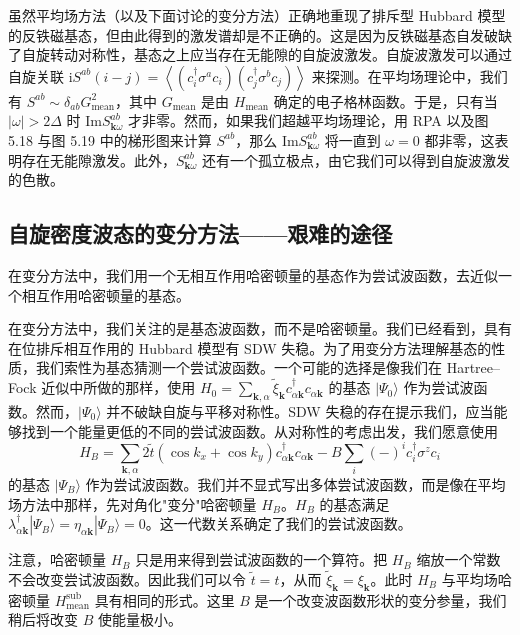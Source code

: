 虽然平均场方法（以及下面讨论的变分方法）正确地重现了排斥型 Hubbard 模型的反铁磁基态，但由此得到的激发谱却是不正确的。这是因为反铁磁基态自发破缺了自旋转动对称性，基态之上应当存在无能隙的自旋波激发。自旋波激发可以通过自旋关联 $\mathrm{i}S^{ab}(i-j)=\left\langle (c^{\dagger}_{i}\sigma^{a}c_{i})(c^{\dagger}_{j}\sigma^{b}c_{j})\right\rangle$ 来探测。在平均场理论中，我们有 $S^{ab}\sim\delta_{ab}G^{2}_{\mathrm{mean}}$，其中 $G_{\mathrm{mean}}$ 是由 $H_{\mathrm{mean}}$ 确定的电子格林函数。于是，只有当 $|\omega|>2\Delta$ 时 $\mathrm{Im}S^{ab}_{\pmb{k}\omega}$ 才非零。然而，如果我们超越平均场理论，用 RPA 以及图 5.18 与图 5.19 中的梯形图来计算 $S^{ab}$，那么 $\mathrm{Im}S^{ab}_{\pmb{k}\omega}$ 将一直到 $\omega=0$ 都非零，这表明存在无能隙激发。此外，$S^{ab}_{\pmb{k}\omega}$ 还有一个孤立极点，由它我们可以得到自旋波激发的色散。

\subsection{自旋密度波态的变分方法——艰难的途径}

\begin{keypoints}
\item 在变分方法中，我们用一个无相互作用哈密顿量的基态作为尝试波函数，去近似一个相互作用哈密顿量的基态。
\end{keypoints}

在变分方法中，我们关注的是基态波函数，而不是哈密顿量。我们已经看到，具有在位排斥相互作用的 Hubbard 模型有 SDW 失稳。为了用变分方法理解基态的性质，我们索性为基态猜测一个尝试波函数。一个可能的选择是像我们在 Hartree–Fock 近似中所做的那样，使用 $H_{0}=\sum_{\pmb{k},\alpha}\tilde{\xi}_{\pmb{k}}c^{\dagger}_{\alpha\pmb{k}}c_{\alpha\pmb{k}}$ 的基态 $|\Psi_{0}\rangle$ 作为尝试波函数。然而，$|\Psi_{0}\rangle$ 并不破缺自旋与平移对称性。SDW 失稳的存在提示我们，应当能够找到一个能量更低的不同的尝试波函数。从对称性的考虑出发，我们愿意使用
\begin{equation*}
H_{B}=\sum_{\pmb{k},\alpha}2\tilde{t}(\cos k_{x}+\cos k_{y})c^{\dagger}_{\alpha\pmb{k}}c_{\alpha\pmb{k}}-B\sum_{i}(-)^{i}c^{\dagger}_{i}\sigma^{z}c_{i}
\end{equation*}
的基态 $|\Psi_{B}\rangle$ 作为尝试波函数。我们并不显式写出多体尝试波函数，而是像在平均场方法中那样，先对角化"变分"哈密顿量 $H_{B}$。$H_{B}$ 的基态满足 $\lambda^{\dagger}_{\alpha\pmb{k}}|\Psi_{B}\rangle=\eta_{\alpha\pmb{k}}|\Psi_{B}\rangle=0$。这一代数关系确定了我们的尝试波函数。

注意，哈密顿量 $H_{B}$ 只是用来得到尝试波函数的一个算符。把 $H_{B}$ 缩放一个常数不会改变尝试波函数。因此我们可以令 $\tilde{t}=t$，从而 $\tilde{\xi}_{\pmb{k}}=\xi_{\pmb{k}}$。此时 $H_{B}$ 与平均场哈密顿量 $H^{\mathrm{sub}}_{\mathrm{mean}}$ 具有相同的形式。这里 $B$ 是一个改变波函数形状的变分参量，我们稍后将改变 $B$ 使能量极小。

